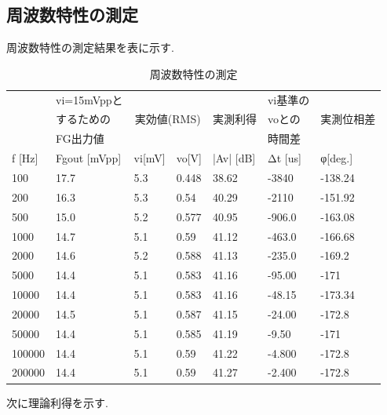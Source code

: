 \documentclass[a4j,10pt,dvipdfmx]{jarticle}
\begin{document}
\subsection{周波数特性の測定}
周波数特性の測定結果を表に示す.
\begin{table}[H]
  \label{6}
  \begin{center}
  \caption{周波数特性の測定}
  \begin{tabular}{|l|l|l|l|l|l|l|}
  \hline
      &vi=15mVppと & \multicolumn{2}{|c|}{}& & vi基準の & \\
      &するための & \multicolumn{2}{|c|}{実効値(RMS)} & 実測利得 & voとの & 実測位相差\\
      &FG出力値 &\multicolumn{2}{|c|}{} &&時間差& \\ \hline
      f [Hz] & Fgout [mVpp] & vi[mV] & vo[V] & |Av| [dB] & Δt [us] & φ[deg.]\\ \hline
      100 & 17.7 & 5.3  & 0.448 & 38.62 & -3840 & -138.24 \\ \hline
      200 & 16.3 & 5.3  & 0.54 & 40.29 & -2110 & -151.92\\ \hline
      500 & 15.0 & 5.2  & 0.577 & 40.95 & -906.0 & -163.08\\ \hline
      1000 & 14.7 & 5.1  & 0.59 & 41.12 & -463.0 & -166.68\\ \hline
      2000 & 14.6 & 5.2  & 0.588 & 41.13 & -235.0 & -169.2\\ \hline
      5000 & 14.4 & 5.1  & 0.583 & 41.16 & -95.00 & -171\\ \hline
      10000 & 14.4 & 5.1  & 0.583 & 41.16 & -48.15 & -173.34 \\ \hline
      20000 & 14.5 & 5.1  & 0.587 & 41.15 & -24.00 & -172.8\\ \hline
      50000 & 14.4 & 5.1  & 0.585 & 41.19 & -9.50 & -171\\ \hline
      100000 & 14.4 & 5.1  & 0.59 & 41.22 & -4.800 & -172.8\\ \hline
      200000 & 14.4 & 5.1  & 0.59 & 41.27 & -2.400 & -172.8\\ \hline
  \end{tabular}
\end{center}
\end{table}
次に理論利得を示す.
\end{document}
